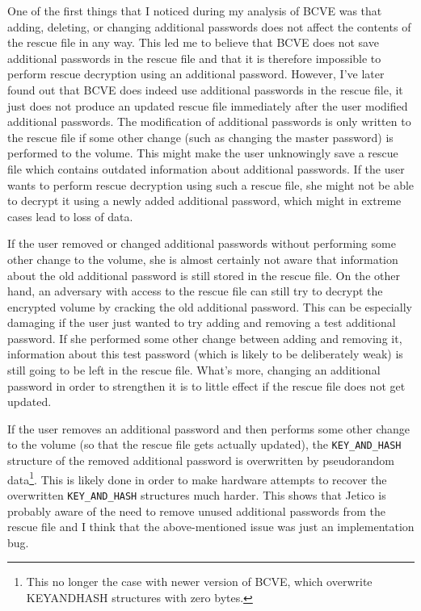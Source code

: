 \documentclass[thesis=B,english]{FITthesis}[2012/10/20]
\begin{document}
	One of the first things that I noticed during my analysis of BCVE was that adding, deleting, or changing additional passwords does not affect the contents of the rescue file in any way. This led me to believe that BCVE does not save additional passwords in the rescue file and that it is therefore impossible to perform rescue decryption using an additional password. However, I've later found out that BCVE does indeed use additional passwords in the rescue file, it just does not produce an updated rescue file immediately after the user modified additional passwords. The modification of additional passwords is only written to the rescue file if some other change (such as changing the master password) is performed to the volume. This might make the user unknowingly save a rescue file which contains outdated information about additional passwords. If the user wants to perform rescue decryption using such a rescue file, she might not be able to decrypt it using a newly added additional password, which might in extreme cases lead to loss of data.
	
	If the user removed or changed additional passwords without performing some other change to the volume, she is almost certainly not aware that information about the old additional password is still stored in the rescue file. On the other hand, an adversary with access to the rescue file can still try to decrypt the encrypted volume by cracking the old additional password. This can be especially damaging if the user just wanted to try adding and removing a test additional password. If she performed some other change between adding and removing it, information about this test password (which is likely to be deliberately weak) is still going to be left in the rescue file. What's more, changing an additional password in order to strengthen it is to little effect if the rescue file does not get updated.
	
	If the user removes an additional password and then performs some other change to the volume (so that the rescue file gets actually updated), the \verb|KEY_AND_HASH| structure of the removed additional password is overwritten by pseudorandom data\footnote{This no longer the case with newer version of BCVE, which overwrite KEY\TextUnderscore{}AND\TextUnderscore{}HASH structures with zero bytes.}. This is likely done in order to make hardware attempts to recover the overwritten \verb|KEY_AND_HASH| structures much harder. This shows that Jetico is probably aware of the need to remove unused additional passwords from the rescue file and I think that the above-mentioned issue was just an implementation bug.
	
\end{document}
